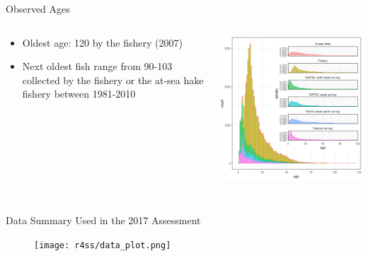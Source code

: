 \documentclass[pdf]{beamer}\usepackage[]{graphicx}\usepackage[]{color}
\begin{document}
\begin{frame}{Observed Ages}
  \begin{columns}
    \begin{column}{0.35\textwidth}
      \begin{itemize}
      \item Oldest age: 120 by the fishery (2007)
      \item Next oldest fish range from 90-103 collected by the fishery or the at-sea hake fishery between 1981-2010
      \end{itemize}
    \end{column}
    \begin{column}{0.65\textwidth}
      \includegraphics[scale = 0.45]{figures/pop2017_agesbysource.png}
    \end{column}
  \end{columns}
\end{frame}


\subsection{}
\begin{frame}{Data Summary Used in the 2017 Assessment}
  \begin{figure}[ht]
    \begin{center}
      \texttt{[image: r4ss/data\_plot.png]}

    \end{center}
  \end{figure}
\end{frame}
\end{document}
